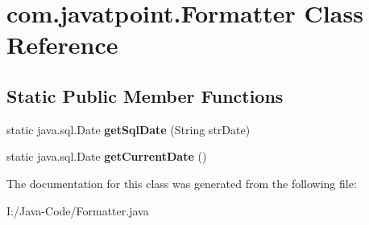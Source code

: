 \hypertarget{classcom_1_1javatpoint_1_1_formatter}{}\section{com.\+javatpoint.\+Formatter Class Reference}
\label{classcom_1_1javatpoint_1_1_formatter}
\subsection*{Static Public Member Functions}
\begin{DoxyCompactItemize}
\item 
\mbox{\label{classcom_1_1javatpoint_1_1_formatter_acc3f5ca2717ce88ce31df33e3ca0274d}} 
static java.\+sql.\+Date {\bfseries get\+Sql\+Date} (String str\+Date)
\item 
\mbox{\label{classcom_1_1javatpoint_1_1_formatter_a55ef075d4593e5c651819cfb04d35f0e}} 
static java.\+sql.\+Date {\bfseries get\+Current\+Date} ()
\end{DoxyCompactItemize}


The documentation for this class was generated from the following file\+:\begin{DoxyCompactItemize}
\item 
I\+:/\+Java-\/\+Code/Formatter.\+java\end{DoxyCompactItemize}
